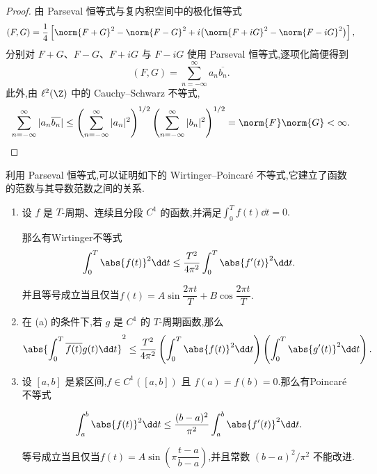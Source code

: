 \begin{proof}
	由 Parseval 恒等式与复内积空间中的极化恒等式
	\[
	(F,G)=\frac14\left[
	\norm{F+G}^2-\norm{F-G}^2
	+i\bigl(\norm{F+iG}^2-\norm{F-iG}^2\bigr)
	\right],
	\]
	分别对 $F+G$、$F-G$、$F+iG$ 与 $F-iG$ 使用 Parseval 恒等式,逐项化简便得到
	\[
	(F,G)=\sum_{n=-\infty}^{\infty}a_n\overline{b_n}.
	\]
	此外,由 $\ell^2(\Z)$ 中的 Cauchy--Schwarz 不等式,
	\[
	\sum_{n=-\infty}^{\infty}|a_n\overline{b_n}|
	\leq
	\left(\sum_{n=-\infty}^{\infty}|a_n|^2\right)^{1/2}
	\left(\sum_{n=-\infty}^{\infty}|b_n|^2\right)^{1/2}
	=\norm{F}\norm{G}<\infty.
	\]
\end{proof}
利用 Parseval 恒等式,可以证明如下的 Wirtinger--Poincar\'e 不等式,它建立了函数的范数与其导数范数之间的关系.
\begin{proposition}
	\begin{enumerate}
		\item[(a)] 设 $f$ 是 $T$-周期、连续且分段 $C^1$ 的函数,并满足$\displaystyle\int_0^T f(t)\dd t=0.$
		
		那么有Wirtinger不等式
\[ \int_0^T \abs{f(t)}^2\dd t
			\leq
			\frac{T^2}{4\pi^2}
			\int_0^T \abs{f'(t)}^2\dd t. \]

		并且等号成立当且仅当$f(t)=A\sin\dfrac{2\pi t}{T}
			+B\cos\dfrac{2\pi t}{T}.$
		\item[(b)] 在 (a) 的条件下,若 $g$ 是 $C^1$ 的 $T$-周期函数,那么\[ \abs{\int_0^T \overline{f(t)}g(t)\dd t}^2
			\leq
			\frac{T^2}{4\pi^2}
			\left(\int_0^T\abs{f(t)}^2\dd t\right)
			\left(\int_0^T\abs{g'(t)}^2\dd t\right). \]
		\item[(c)] 设 $[a,b]$ 是紧区间,$f\in C^1([a,b])$ 且
		$f(a)=f(b)=0$.那么有Poincar\'e 不等式 
		
		\begin{equation}\label{eq:poincare-interval}
			\int_a^b\abs{f(t)}^2\dd t
			\leq
			\frac{(b-a)^2}{\pi^2}
			\int_a^b\abs{f'(t)}^2\dd t. 
		\end{equation}
		
		等号成立当且仅当$f(t)=A\sin(\pi\dfrac{t-a}{b-a})$,并且常数 $(b-a)^2/\pi^2$ 不能改进.
	\end{enumerate}
\end{proposition}

